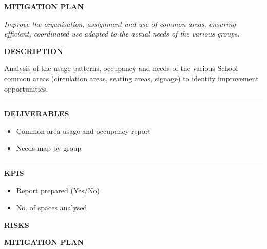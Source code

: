 \documentclass[11pt,a4paper]{scrreprt}
\newcommand{\fieldlabel}[1]{%
  {\footnotesize\sffamily\bfseries\color{mutedcolor}\MakeUppercase{#1}}\par\nopagebreak[4]
}
\newcommand{\fieldsep}{\vspace{3pt}\noindent\textcolor{bordercolor}{\rule{\linewidth}{0.4pt}}\vspace{3pt}\par}
\begin{document}
\begin{tcolorbox}[mitbox]
{\footnotesize\sffamily\bfseries\color{green!40!black} MITIGATION PLAN}\par{}
\end{tcolorbox}
\vspace{8pt}

\newpage
{}
{\small\color{mutedcolor}\itshape Improve the organisation, assignment and use of common areas, ensuring efficient, coordinated use adapted to the actual needs of the various groups.}\par\vspace{6pt}

\begin{tcolorbox}[pabox={espcolor}{A.P.7.1 \enspace\textbullet\enspace Diagnosis and Analysis of Common Area Usage}]

\fieldlabel{Description}
{\small Analysis of the usage patterns, occupancy and needs of the various School common areas (circulation areas, seating areas, signage) to identify improvement opportunities.}\par
\fieldsep
\fieldlabel{Deliverables}
{\small \begin{itemize}[noitemsep,topsep=2pt]
\item Common area usage and occupancy report
\item Needs map by group
\end{itemize}}\par
\fieldsep
\fieldlabel{KPIs}
{\small \begin{itemize}[noitemsep,topsep=2pt]
\item Report prepared (Yes/No)
\item No. of spaces analysed
\end{itemize}}\par
\end{tcolorbox}
\begin{tcolorbox}[riskbox]
{\footnotesize\sffamily\bfseries\color{red!50!black} RISKS}\par{}
\end{tcolorbox}
\begin{tcolorbox}[mitbox]
{\footnotesize\sffamily\bfseries\color{green!40!black} MITIGATION PLAN}\par{}
\end{tcolorbox}
\vspace{8pt}
\end{document}

